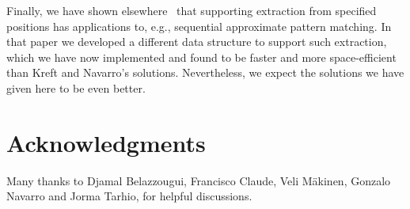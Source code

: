 \documentclass[review]{elsarticle}
\begin{document}
Finally, we have shown elsewhere~\cite{GGP11} that supporting extraction from specified positions has applications to, e.g., sequential approximate pattern matching.  In that paper we developed a different data structure to support such extraction, which we have now implemented and found to be faster and more space-efficient than Kreft and Navarro's solutions.  Nevertheless, we expect the solutions we have given here to be even better.

\section*{Acknowledgments}

Many thanks to Djamal Belazzougui, Francisco Claude, Veli M\"akinen, Gonzalo Navarro and Jorma Tarhio, for helpful discussions.



\end{document}
